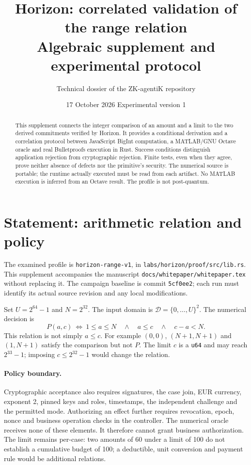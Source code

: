 \documentclass[11pt,a4paper]{article}
\title{Horizon: correlated validation of the range relation\\
  \large Algebraic supplement and experimental protocol}
\author{Technical dossier of the ZK-agentiK repository}
\date{17 October 2026 \quad Experimental version 1}
\newcommand{\code}[1]{\nolinkurl{#1}}
\begin{document}
\maketitle
\begin{abstract}
This supplement connects the integer comparison of an amount and a limit to
the two derived commitments verified by Horizon. It provides a conditional
derivation and a correlation protocol between JavaScript BigInt computation,
a MATLAB/GNU Octave oracle and real Bulletproofs execution in Rust.
Success conditions distinguish application rejection from cryptographic
rejection. Finite tests, even when they agree, prove neither absence of defects
nor the primitive's security. The numerical source is portable; the runtime
actually executed must be read from each artifact. No MATLAB execution is
inferred from an Octave result. The profile is not post-quantum.
\end{abstract}

\section{Statement: arithmetic relation and policy}
The examined profile is \code{horizon-range-v1}, in
\code{labs/horizon/proof/src/lib.rs}. This supplement accompanies the manuscript
\code{docs/whitepaper/whitepaper.tex} without replacing it. The campaign baseline
is commit \code{5cf0ee2}; each run must identify its actual source revision
and any local modifications.

Set $U=2^{64}-1$ and $N=2^{32}$. The input domain is
$\mathcal D=\{0,\ldots,U\}^2$. The numerical decision is
\begin{equation}\label{eq:predicate}
 P(a,c)\ \Longleftrightarrow\ 1\le a\le N\quad\land\quad
 a\le c\quad\land\quad c-a<N.
\end{equation}
This relation is not simply $a\le c$. For example $(0,0)$,
$(N+1,N+1)$ and $(1,N+1)$ satisfy the comparison but not $P$.
The limit $c$ is a \code{u64} and may reach $2^{33}-1$;
imposing $c\le2^{32}-1$ would change the relation.

\paragraph{Policy boundary.}
Cryptographic acceptance also requires signatures, the case join, EUR currency,
exponent 2, pinned keys and roles, timestamps, the independent challenge and
the permitted mode. Authorizing an effect further requires revocation, epoch,
nonce and business operation checks in the controller.
The numerical oracle receives none of these elements. It therefore cannot
grant business authorization. The limit remains per-case: two amounts of 60
under a limit of 100 do not establish a cumulative budget of 100;
a deductible, unit conversion and payment rule would be additional relations.
\end{document}
